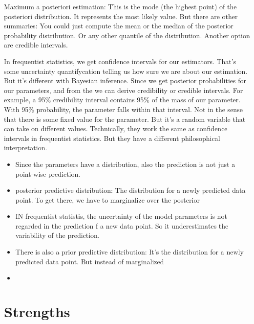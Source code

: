 \documentclass[
  10pt,
]{scrbook}
\providecommand{\tightlist}{%
  \setlength{\itemsep}{0pt}\setlength{\parskip}{0pt}}
\begin{document}
Maximum a posteriori estimation: This is the mode (the highest point) of the posteriori distribution. It represents the most likely value.
But there are other summaries:
You could just compute the mean or the median of the posterior probability distribution.
Or any other quantile of the distribution.
Another option are credible intervals.

In frequentist statistics, we get confidence intervals for our estimators.
That's some uncertainty quantifycation telling us how sure we are about our estimation.
But it's different with Bayesian inference.
Since we get posterior probabilities for our parameters, and from the we can derive credibility or credible intervals.
For example, a 95\% credibility interval contains 95\% of the mass of our parameter.
With 95\% probability, the parameter falls within that interval.
Not in the sense that there is some fixed value for the parameter.
But it's a random variable that can take on different values.
Technically, they work the same as confidence intervals in frequentist statistics.
But they have a different philosophical interpretation.

\begin{itemize}
\tightlist
\item
  Since the parameters have a distribution, also the prediction is not just a point-wise prediction.
\item
  posterior predictive distribution: The distribution for a newly predicted data point. To get there, we have to marginalize over the posterior
\item
  IN frequentist statistis, the uncertainty of the model parameters is not regarded in the prediction f a new data point. So it underestimates the variability of the prediction.
\item
  There is also a prior predictive distribution: It's the distribution for a newly predicted data point. But instead of marginalized
\item
\end{itemize}

\hypertarget{strengths-2}{%
\section{Strengths}\label{strengths-2}}
\end{document}
